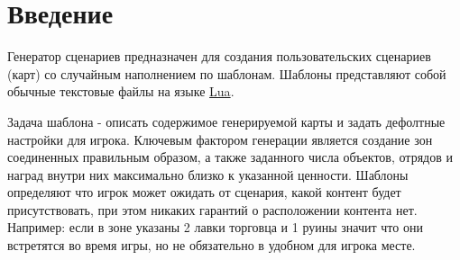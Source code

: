 \section{Введение}
Генератор сценариев предназначен для создания пользовательских сценариев (карт) со случайным наполнением по шаблонам. Шаблоны представляют собой обычные текстовые файлы на языке \href{https://www.lua.org/}{Lua}.

Задача шаблона - описать содержимое генерируемой карты и задать дефолтные настройки для игрока. Ключевым фактором генерации является создание зон соединенных правильным образом, а также заданного числа объектов, отрядов и наград внутри них максимально близко к указанной ценности. Шаблоны определяют что игрок может ожидать от сценария, какой контент будет присутствовать, при этом никаких гарантий о расположении контента нет. Например: если в зоне указаны 2 лавки торговца и 1 руины значит что они встретятся во время игры, но не обязательно в удобном для игрока месте.
